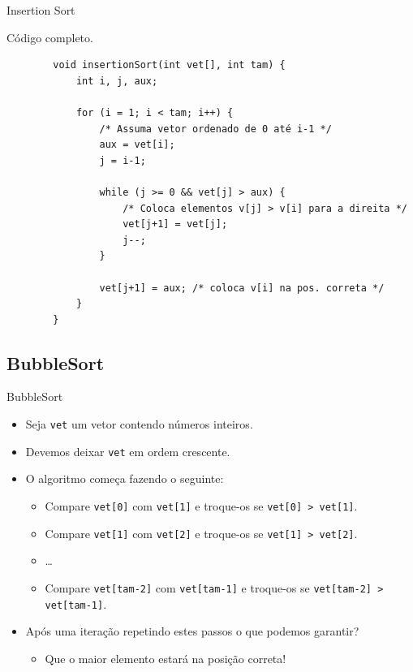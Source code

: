 \documentclass[handout]{beamer}
\newcommand{\cod}[1]{\texttt{#1}}
\begin{document}
\begin{frame}[fragile]{Insertion Sort}

    Código completo.
    \vspace{-1em}
    \begin{verbatim}
        void insertionSort(int vet[], int tam) {
            int i, j, aux;

            for (i = 1; i < tam; i++) {
                /* Assuma vetor ordenado de 0 até i-1 */
                aux = vet[i];
                j = i-1;

                while (j >= 0 && vet[j] > aux) {
                    /* Coloca elementos v[j] > v[i] para a direita */
                    vet[j+1] = vet[j];
                    j--;
                }

                vet[j+1] = aux; /* coloca v[i] na pos. correta */
            }
        }
    \end{verbatim}

\end{frame}

\subsection{BubbleSort}

\begin{frame}[fragile]{BubbleSort}
    
    \begin{itemize}
        \item Seja \cod{vet} um vetor contendo números inteiros.
        \item Devemos deixar \cod{vet} em ordem crescente.
        \item O algoritmo começa fazendo o seguinte:
        \begin{itemize}
            \item Compare \cod{vet[0]} com \cod{vet[1]} e troque-os se \cod{vet[0] > vet[1]}.
            \item Compare \cod{vet[1]} com \cod{vet[2]} e troque-os se \cod{vet[1] > vet[2]}.
            \item \ldots
            \item Compare \cod{vet[tam-2]} com \cod{vet[tam-1]} e troque-os se \cod{vet[tam-2] > vet[tam-1]}.
        \end{itemize}
        \item Após uma iteração repetindo estes passos o que podemos garantir?
        \begin{itemize}
            \item Que o maior elemento estará na posição correta!
        \end{itemize}
    \end{itemize}

\end{frame}
\end{document}
